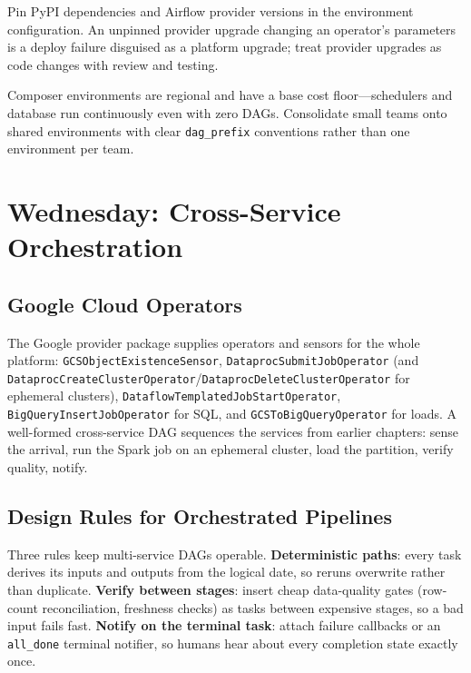 \begin{tipbox}
Pin PyPI dependencies and Airflow provider versions in the environment configuration. An unpinned provider upgrade changing an operator's parameters is a deploy failure disguised as a platform upgrade; treat provider upgrades as code changes with review and testing.
\end{tipbox}

\begin{notebox}
Composer environments are regional and have a base cost floor---schedulers and database run continuously even with zero DAGs. Consolidate small teams onto shared environments with clear \texttt{dag\_prefix} conventions rather than one environment per team.
\end{notebox}

\section{Wednesday: Cross-Service Orchestration}

\subsection{Google Cloud Operators}
The Google provider package supplies operators and sensors for the whole platform: \texttt{GCSObjectExistenceSensor}, \texttt{DataprocSubmitJobOperator} (and \texttt{DataprocCreateClusterOperator}/\texttt{DataprocDeleteClusterOperator} for ephemeral clusters), \texttt{DataflowTemplatedJobStartOperator}, \texttt{BigQueryInsertJobOperator} for SQL, and \texttt{GCSToBigQueryOperator} for loads. A well-formed cross-service DAG sequences the services from earlier chapters: sense the arrival, run the Spark job on an ephemeral cluster, load the partition, verify quality, notify.

\subsection{Design Rules for Orchestrated Pipelines}
Three rules keep multi-service DAGs operable. \textbf{Deterministic paths}: every task derives its inputs and outputs from the logical date, so reruns overwrite rather than duplicate. \textbf{Verify between stages}: insert cheap data-quality gates (row-count reconciliation, freshness checks) as tasks between expensive stages, so a bad input fails fast. \textbf{Notify on the terminal task}: attach failure callbacks or an \texttt{all\_done} terminal notifier, so humans hear about every completion state exactly once.

